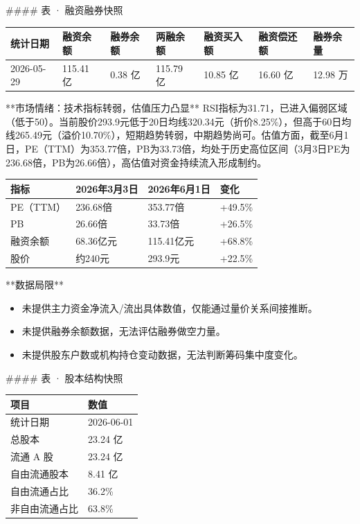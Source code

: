 \documentclass[12pt,a4paper]{article}
\begin{document}
\#\#\#\# 表 · 融资融券快照

\begin{table}[htbp]
\centering
\begin{tabular}{lllllll}
\toprule
统计日期 & 融资余额 & 融券余额 & 两融余额 & 融资买入额 & 融资偿还额 & 融券余量 \\
\midrule
2026-05-29 & 115.41 亿 & 0.38 亿 & 115.79 亿 & 10.85 亿 & 16.60 亿 & 12.98 万 \\
\bottomrule
\end{tabular}
\end{table}


**市场情绪：技术指标转弱，估值压力凸显**
RSI指标为31.71，已进入偏弱区域（低于50）。当前股价293.9元低于20日均线320.34元（折价8.25\%），但高于60日均线265.49元（溢价10.70\%），短期趋势转弱，中期趋势尚可。估值方面，截至6月1日，PE（TTM）为353.77倍，PB为33.73倍，均处于历史高位区间（3月3日PE为236.68倍，PB为26.66倍），高估值对资金持续流入形成制约。

\begin{table}[htbp]
\centering
\begin{tabular}{llll}
\toprule
指标 & 2026年3月3日 & 2026年6月1日 & 变化 \\
\midrule
PE（TTM） & 236.68倍 & 353.77倍 & +49.5\% \\
PB & 26.66倍 & 33.73倍 & +26.5\% \\
融资余额 & 68.36亿元 & 115.41亿元 & +68.8\% \\
股价 & 约240元 & 293.9元 & +22.5\% \\
\bottomrule
\end{tabular}
\end{table}


**数据局限**
\begin{itemize}
\item 未提供主力资金净流入/流出具体数值，仅能通过量价关系间接推断。
\item 未提供融券余额数据，无法评估融券做空力量。
\item 未提供股东户数或机构持仓变动数据，无法判断筹码集中度变化。
\end{itemize}

\#\#\#\# 表 · 股本结构快照

\begin{table}[htbp]
\centering
\begin{tabular}{ll}
\toprule
项目 & 数值 \\
\midrule
统计日期 & 2026-06-01 \\
总股本 & 23.24 亿 \\
流通 A 股 & 23.24 亿 \\
自由流通股本 & 8.41 亿 \\
自由流通占比 & 36.2\% \\
非自由流通占比 & 63.8\% \\
\bottomrule
\end{tabular}
\end{table}
\end{document}
